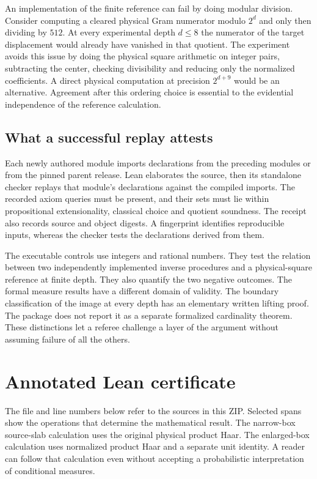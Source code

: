 \documentclass[12pt,letterpaper]{article}
\begin{document}
An implementation of the finite reference can fail by doing modular division. Consider computing a cleared physical Gram numerator modulo $2^d$ and only then dividing by $512$. At every experimental depth $d\le8$ the numerator of the target displacement would already have vanished in that quotient. The experiment avoids this issue by doing the physical square arithmetic on integer pairs, subtracting the center, checking divisibility and reducing only the normalized coefficients. A direct physical computation at precision $2^{d+9}$ would be an alternative. Agreement after this ordering choice is essential to the evidential independence of the reference calculation.

\subsection{What a successful replay attests}
Each newly authored module imports declarations from the preceding modules or from the pinned parent release. Lean elaborates the source, then its standalone checker replays that module's declarations against the compiled imports. The recorded axiom queries must be present, and their sets must lie within propositional extensionality, classical choice and quotient soundness. The receipt also records source and object digests. A fingerprint identifies reproducible inputs, whereas the checker tests the declarations derived from them.

The executable controls use integers and rational numbers. They test the relation between two independently implemented inverse procedures and a physical-square reference at finite depth. They also quantify the two negative outcomes. The formal measure results have a different domain of validity. The boundary classification of the image at every depth has an elementary written lifting proof. The package does not report it as a separate formalized cardinality theorem. These distinctions let a referee challenge a layer of the argument without assuming failure of all the others.
\section{Annotated Lean certificate}
The file and line numbers below refer to the sources in this ZIP. Selected spans show the operations that determine the mathematical result. The narrow-box source-slab calculation uses the original physical product Haar. The enlarged-box calculation uses normalized product Haar and a separate unit identity. A reader can follow that calculation even without accepting a probabilistic interpretation of conditional measures.
\end{document}
